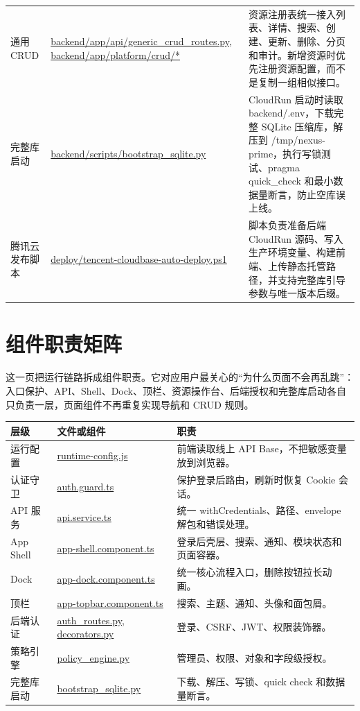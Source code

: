 \documentclass[UTF8,zihao=-4]{ctexart}
\newcommand{\code}[1]{{\small\url{#1}}}
\begin{document}
\begin{longtable}{p{}p{}p{}}
通用 CRUD & \code{backend/app/api/generic\_crud\_routes.py, backend/app/platform/crud/*} & 资源注册表统一接入列表、详情、搜索、创建、更新、删除、分页和审计。新增资源时优先注册资源配置，而不是复制一组相似接口。 \\
完整库启动 & \code{backend/scripts/bootstrap\_sqlite.py} & CloudRun 启动时读取 backend/.env，下载完整 SQLite 压缩库，解压到 /tmp/nexus-prime，执行写锁测试、pragma quick\_check 和最小数据量断言，防止空库误上线。 \\
腾讯云发布脚本 & \code{deploy/tencent-cloudbase-auto-deploy.ps1} & 脚本负责准备后端 CloudRun 源码、写入生产环境变量、构建前端、上传静态托管路径，并支持完整库引导参数与唯一版本后缀。 \\
\bottomrule
\end{longtable}
\clearpage

\section{组件职责矩阵}
这一页把运行链路拆成组件职责。它对应用户最关心的“为什么页面不会再乱跳”：入口保护、API、Shell、Dock、顶栏、资源操作台、后端授权和完整库启动各自只负责一层，页面组件不再重复实现导航和 CRUD 规则。

\begin{tabularx}{\textwidth}{p{}p{}X}
\toprule
层级 & 文件或组件 & 职责 \\
\midrule
运行配置 & \code{runtime-config.js} & 前端读取线上 API Base，不把敏感变量放到浏览器。 \\
认证守卫 & \code{auth.guard.ts} & 保护登录后路由，刷新时恢复 Cookie 会话。 \\
API 服务 & \code{api.service.ts} & 统一 withCredentials、路径、envelope 解包和错误处理。 \\
App Shell & \code{app-shell.component.ts} & 登录后壳层、搜索、通知、模块状态和页面容器。 \\
Dock & \code{app-dock.component.ts} & 统一核心流程入口，删除按钮拉长动画。 \\
顶栏 & \code{app-topbar.component.ts} & 搜索、主题、通知、头像和面包屑。 \\
后端认证 & \code{auth_routes.py}, \code{decorators.py} & 登录、CSRF、JWT、权限装饰器。 \\
策略引擎 & \code{policy_engine.py} & 管理员、权限、对象和字段级授权。 \\
完整库启动 & \code{bootstrap_sqlite.py} & 下载、解压、写锁、quick check 和数据量断言。 \\
\bottomrule
\end{tabularx}
\end{document}

